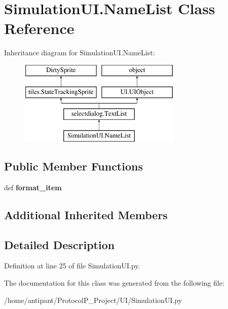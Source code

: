 \hypertarget{classSimulationUI_1_1NameList}{\section{Simulation\-U\-I.\-Name\-List Class Reference}
\label{classSimulationUI_1_1NameList}
}
Inheritance diagram for Simulation\-U\-I.\-Name\-List\-:\begin{figure}[H]
\begin{center}
\leavevmode
\includegraphics[height=4.000000cm]{classSimulationUI_1_1NameList}
\end{center}
\end{figure}
\subsection*{Public Member Functions}
\begin{DoxyCompactItemize}
\item 
\hypertarget{classSimulationUI_1_1NameList_a1df94c5d7deb6868ab9d422fdcef7dc6}{def {\bfseries format\-\_\-item}}\label{classSimulationUI_1_1NameList_a1df94c5d7deb6868ab9d422fdcef7dc6}

\end{DoxyCompactItemize}
\subsection*{Additional Inherited Members}


\subsection{Detailed Description}


Definition at line 25 of file Simulation\-U\-I.\-py.



The documentation for this class was generated from the following file\-:\begin{DoxyCompactItemize}
\item 
/home/antipant/\-Protocol\-P\-\_\-\-Project/\-U\-I/Simulation\-U\-I.\-py\end{DoxyCompactItemize}
